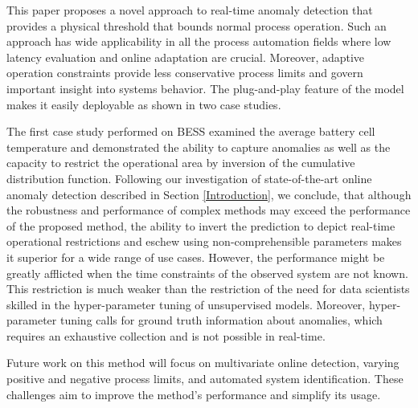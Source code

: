 This paper proposes a novel approach to real-time anomaly detection that provides a physical threshold that bounds normal process operation. Such an approach has wide applicability in all the process automation fields where low latency evaluation and online adaptation are crucial. Moreover, adaptive operation constraints provide less conservative process limits and govern important insight into systems behavior. The plug-and-play feature of the model makes it easily deployable as shown in two case studies. 

The first case study performed on BESS examined the average battery cell temperature and demonstrated the ability to capture anomalies as well as the capacity to restrict the operational area by inversion of the cumulative distribution function. Following our investigation of state-of-the-art online anomaly detection described in Section \ref{Introduction}, we conclude, that although the robustness and performance of complex methods may exceed the performance of the proposed method, the ability to invert the prediction to depict real-time operational restrictions and eschew using non-comprehensible parameters makes it superior for a wide range of use cases. However, the performance might be greatly afflicted when the time constraints of the observed system are not known. This restriction is much weaker than the restriction of the need for data scientists skilled in the hyper-parameter tuning of unsupervised models. Moreover, hyper-parameter tuning calls for ground truth information about anomalies, which requires an exhaustive collection and is not possible in real-time. 

Future work on this method will focus on multivariate online detection, varying positive and negative process limits, and automated system identification. These challenges aim to improve the method's performance and simplify its usage.




